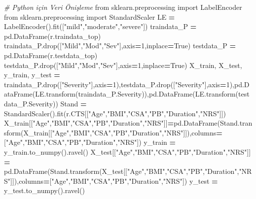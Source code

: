 \documentclass[12pt,twoside]{deuthesis}
\newenvironment{Shaded}{\begin{snugshade}}{\end{snugshade}}
\newcommand{\CommentTok}[1]{\textcolor[rgb]{0.56,0.35,0.01}{\textit{#1}}}
\newcommand{\DecValTok}[1]{\textcolor[rgb]{0.00,0.00,0.81}{#1}}
\newcommand{\ImportTok}[1]{#1}
\newcommand{\NormalTok}[1]{#1}
\newcommand{\OperatorTok}[1]{\textcolor[rgb]{0.81,0.36,0.00}{\textbf{#1}}}
\newcommand{\StringTok}[1]{\textcolor[rgb]{0.31,0.60,0.02}{#1}}
\newcommand{\VariableTok}[1]{\textcolor[rgb]{0.00,0.00,0.00}{#1}}
\begin{document}
\begin{Shaded}
\begin{Highlighting}[]
\CommentTok{\# Python için Veri Önişleme }
\ImportTok{from}\NormalTok{ sklearn.preprocessing }\ImportTok{import}\NormalTok{ LabelEncoder}
\ImportTok{from}\NormalTok{ sklearn.preprocessing }\ImportTok{import}\NormalTok{ StandardScaler}
\NormalTok{LE }\OperatorTok{=}\NormalTok{ LabelEncoder().fit([}\StringTok{"mild"}\NormalTok{,}\StringTok{"moderate"}\NormalTok{,}\StringTok{"severe"}\NormalTok{])}
\NormalTok{traindata\_P }\OperatorTok{=}\NormalTok{ pd.DataFrame(r.traindata\_top)}
\NormalTok{traindata\_P.drop([}\StringTok{"Mild"}\NormalTok{,}\StringTok{"Mod"}\NormalTok{,}\StringTok{"Sev"}\NormalTok{],axis}\OperatorTok{=}\DecValTok{1}\NormalTok{,inplace}\OperatorTok{=}\VariableTok{True}\NormalTok{)}
\NormalTok{testdata\_P }\OperatorTok{=}\NormalTok{ pd.DataFrame(r.testdata\_top)}
\NormalTok{testdata\_P.drop([}\StringTok{"Mild"}\NormalTok{,}\StringTok{"Mod"}\NormalTok{,}\StringTok{"Sev"}\NormalTok{],axis}\OperatorTok{=}\DecValTok{1}\NormalTok{,inplace}\OperatorTok{=}\VariableTok{True}\NormalTok{)}
\NormalTok{X\_train, X\_test, y\_train, y\_test }\OperatorTok{=}\NormalTok{ traindata\_P.drop([}\StringTok{"Severity"}\NormalTok{],axis}\OperatorTok{=}\DecValTok{1}\NormalTok{),testdata\_P.drop([}\StringTok{"Severity"}\NormalTok{],axis}\OperatorTok{=}\DecValTok{1}\NormalTok{),pd.DataFrame(LE.transform(traindata\_P.Severity)),pd.DataFrame(LE.transform(testdata\_P.Severity))}
\NormalTok{Stand }\OperatorTok{=}\NormalTok{ StandardScaler().fit(r.CTS[[}\StringTok{"Age"}\NormalTok{,}\StringTok{"BMI"}\NormalTok{,}\StringTok{"CSA"}\NormalTok{,}\StringTok{"PB"}\NormalTok{,}\StringTok{"Duration"}\NormalTok{,}\StringTok{"NRS"}\NormalTok{]])}
\NormalTok{X\_train[[}\StringTok{"Age"}\NormalTok{,}\StringTok{"BMI"}\NormalTok{,}\StringTok{"CSA"}\NormalTok{,}\StringTok{"PB"}\NormalTok{,}\StringTok{"Duration"}\NormalTok{,}\StringTok{"NRS"}\NormalTok{]]}\OperatorTok{=}\NormalTok{pd.DataFrame(Stand.transform(X\_train[[}\StringTok{"Age"}\NormalTok{,}\StringTok{"BMI"}\NormalTok{,}\StringTok{"CSA"}\NormalTok{,}\StringTok{"PB"}\NormalTok{,}\StringTok{"Duration"}\NormalTok{,}\StringTok{"NRS"}\NormalTok{]]),columns}\OperatorTok{=}\NormalTok{[}\StringTok{"Age"}\NormalTok{,}\StringTok{"BMI"}\NormalTok{,}\StringTok{"CSA"}\NormalTok{,}\StringTok{"PB"}\NormalTok{,}\StringTok{"Duration"}\NormalTok{,}\StringTok{"NRS"}\NormalTok{])}
\NormalTok{y\_train }\OperatorTok{=}\NormalTok{ y\_train.to\_numpy().ravel()}
\NormalTok{X\_test[[}\StringTok{"Age"}\NormalTok{,}\StringTok{"BMI"}\NormalTok{,}\StringTok{"CSA"}\NormalTok{,}\StringTok{"PB"}\NormalTok{,}\StringTok{"Duration"}\NormalTok{,}\StringTok{"NRS"}\NormalTok{]] }\OperatorTok{=}\NormalTok{ pd.DataFrame(Stand.transform(X\_test[[}\StringTok{"Age"}\NormalTok{,}\StringTok{"BMI"}\NormalTok{,}\StringTok{"CSA"}\NormalTok{,}\StringTok{"PB"}\NormalTok{,}\StringTok{"Duration"}\NormalTok{,}\StringTok{"NRS"}\NormalTok{]]),columns}\OperatorTok{=}\NormalTok{[}\StringTok{"Age"}\NormalTok{,}\StringTok{"BMI"}\NormalTok{,}\StringTok{"CSA"}\NormalTok{,}\StringTok{"PB"}\NormalTok{,}\StringTok{"Duration"}\NormalTok{,}\StringTok{"NRS"}\NormalTok{])}
\NormalTok{y\_test }\OperatorTok{=}\NormalTok{ y\_test.to\_numpy().ravel()}
\end{Highlighting}
\end{Shaded}
\end{document}
